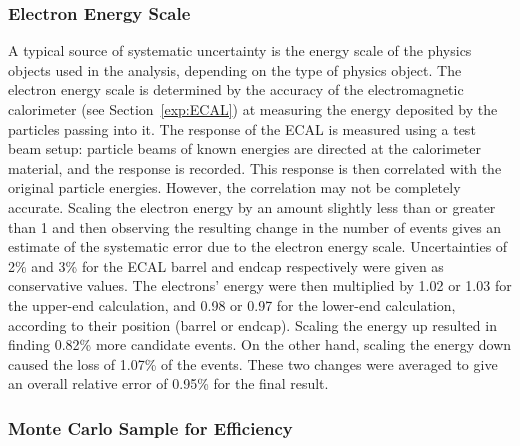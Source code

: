 
\subsubsection{Electron Energy Scale}
\label{anMeth:SystsOtherEleEScale}


A typical source of systematic uncertainty 
is the energy scale of the physics objects 
used in the analysis, 
depending on the type of physics object.  
The electron energy scale is determined 
by the accuracy of the electromagnetic 
calorimeter (see Section~\ref{exp:ECAL})
at measuring the energy 
deposited by the particles passing into it.  
The response of the ECAL is measured 
using a test beam setup: 
particle beams of known energies are 
directed at the calorimeter material, 
and the response is recorded.  
This response is then correlated with the 
original particle energies.  
However, the correlation may not be completely 
accurate.  
Scaling the electron energy by an amount 
slightly less than or greater than 1 
and then observing the resulting change 
in the number of \Zee events 
gives an estimate of the systematic error 
due to the electron energy scale.  
Uncertainties of 2\% and 3\% %
for the ECAL barrel and endcap respectively 
were given as conservative values.  
The electrons' energy were then multiplied 
by 1.02 or 1.03 for the upper-end calculation, 
and 0.98 or 0.97 for the lower-end calculation, 
according to their position (barrel or endcap).  
Scaling the energy up resulted in finding 
0.82\% more \Zee candidate events.  
On the other hand, scaling the energy down 
caused the loss of 1.07\% of the events.  
These two changes were averaged 
to give an overall relative error 
of 0.95\% for the final result.  

\subsubsection{Monte Carlo Sample for Efficiency}
\label{anMeth:SystsOtherMCEff}

